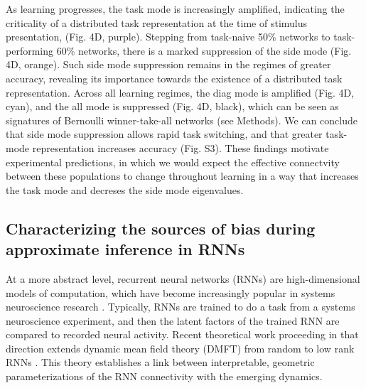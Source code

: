 \documentclass[11pt]{article}
\begin{document}
As learning progresses, the task mode is increasingly amplified, indicating the criticality of a distributed task representation at the time of stimulus presentation, (Fig. 4D, purple).  Stepping from task-naive 50\% networks to task-performing 60\% networks, there is a marked suppression of the side mode (Fig. 4D, orange).  Such side mode suppression remains in the regimes of greater accuracy, revealing its importance towards the existence of a distributed task representation.   Across all learning regimes, the diag mode is amplified (Fig. 4D, cyan), and the all mode is suppressed (Fig. 4D, black), which can be seen as signatures of Bernoulli winner-take-all networks (see Methods).  We can conclude that side mode suppression allows rapid task switching, and that greater task-mode representation increases accuracy (Fig. S3).  These findings motivate experimental predictions, in which we would expect the effective connectvity between these populations to change throughout learning in a way that increases the task mode and decreses the side mode eigenvalues.

\subsection{Characterizing the sources of bias during approximate inference in RNNs}
At a more abstract level, recurrent neural networks (RNNs) are high-dimensional models of computation, which have become increasingly popular in systems neuroscience research \cite{barak2017recurrent}. 
Typically, RNNs are trained to do a task from a systems neuroscience experiment, and then the latent factors of the trained RNN are compared to recorded neural activity.  
Recent theoretical work proceeding in that direction extends dynamic mean field theory (DMFT) from random \cite{sompolinsky1988chaos} to low rank RNNs \cite{mastroguiseppe2018linking}.
This theory establishes a link between interpretable, geometric parameterizations of the RNN connectivity with the emerging dynamics.
\end{document}
